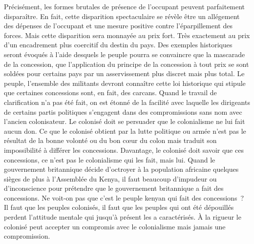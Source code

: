 \documentclass[french,twoside]{book} %
\begin{document}
Précisément, les formes brutales de présence de l’occupant peuvent parfaitement disparaître. En fait, cette disparition spectaculaire se révèle être un allégement des dépenses de l’occupant et une mesure positive contre l’éparpillement des forces. Mais cette disparition sera monnayée au prix fort. Très exactement au prix d’un encadrement plus coercitif du destin du pays. Des exemples historiques seront évoqués à l’aide desquels le peuple pourra se convaincre que la mascarade de la concession, que l’application du principe de la concession à tout prix se sont soldées pour certains pays par un asservissement plus discret mais plus total. Le peuple, l’ensemble des militants devront connaître cette loi historique qui stipule que certaines concessions sont, en fait, des carcans. Quand le travail de clarification n’a pas été fait, on est étonné de la facilité avec laquelle les dirigeants de certains partis politiques s’engagent dans des compromissions   sans nom avec l’ancien colonisateur. Le colonisé doit se persuader que le colonialisme ne lui fait aucun don. Ce que le colonisé obtient par la lutte politique ou armée n’est pas le résultat de la bonne volonté ou du bon cœur du colon mais traduit son impossibilité à différer les concessions. Davantage, le colonisé doit savoir que ces concessions, ce n’est pas le colonialisme qui les fait, mais lui. Quand le gouvernement britannique décide d’octroyer à la population africaine quelques sièges de plus à l’Assemblée du Kenya, il faut beaucoup d’impudeur ou d’inconscience pour prétendre que le gouvernement britannique a fait des concessions. Ne voit-on pas que c’est le peuple kenyan qui fait des concessions ? Il faut que les peuples colonisés, il faut que les peuples qui ont été dépouillés perdent l’attitude mentale qui jusqu’à présent les a caractérisés. À la rigueur le colonisé peut accepter un compromis avec le colonialisme mais jamais une compromission.\par
\bigbreak
\end{document}
